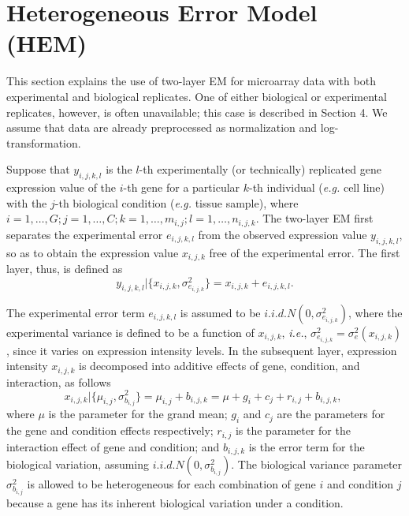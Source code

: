 \documentclass[12pt]{article}
\begin{document}
\section{Heterogeneous Error Model (HEM)}
This section explains the use of two-layer EM for microarray data with both experimental and biological replicates.
One of either biological or experimental replicates, however, is often unavailable; 
this case is described in Section 4. We assume that data are already preprocessed as normalization and log-transformation.

Suppose that $y_{i,j,k,l}$ is the $l$-th experimentally (or technically) replicated gene expression value  
of the $i$-th gene for a particular $k$-th individual ({\it e.g.} cell line) 
with the $j$-th biological condition ({\it e.g.} tissue sample), 
where $i = 1, \ldots, G; j = 1, \ldots, C; k = 1, \ldots, m_{i,j}; l = 1, \ldots, n_{i,j,k}$.
The two-layer EM first separates the experimental error $e_{i,j,k,l}$ from the observed expression value $y_{i,j,k,l}$, 
so as to obtain the expression value $x_{i,j,k}$ free of the experimental error. 
The first layer, thus, is defined as
\begin{equation}
y_{i,j,k,l}| \{x_{i,j,k}, \sigma^2_{e_{i,j,k}} \} = x_{i,j,k} + e_{i,j,k,l}.
\end{equation}



The experimental error term $e_{i,j,k,l}$ is assumed to be $i.i.d. N(0, \sigma^2_{e_{i,j,k}})$,
where the experimental variance is defined to be a function of $x_{i,j,k}$, 
{\it i.e.}, $\sigma^2_{e_{i,j,k}} = \sigma^2_e(x_{i,j,k})$,  
since it varies on expression intensity levels. 
In the subsequent layer, expression intensity $x_{i,j,k}$ is decomposed into additive effects of 
gene, condition, and interaction, as follows
\begin{equation}\label{em2}
x_{i,j,k} | \{ \mu_{i,j}, \sigma^2_{b_{i,j}}\}= \mu_{i,j} + b_{i,j,k} = \mu + g_i + c_j + r_{i,j} + b_{i,j,k},\;
\end{equation}
where $\mu$ is the parameter for the grand mean; $g_i$ and $c_j$ are the parameters for the gene and condition
effects respectively;
$r_{i,j}$ is the parameter for the interaction effect of gene and condition;
 and $b_{i,j,k}$ is the error term for the biological variation, assuming $i.i.d. N(0,\sigma^2_{b_{i,j}})$.
The biological variance parameter $\sigma^2_{b_{i,j}}$ is allowed to be heterogeneous for each combination of gene $i$ and condition $j$
because a gene has its inherent biological variation under a condition.
\end{document}
